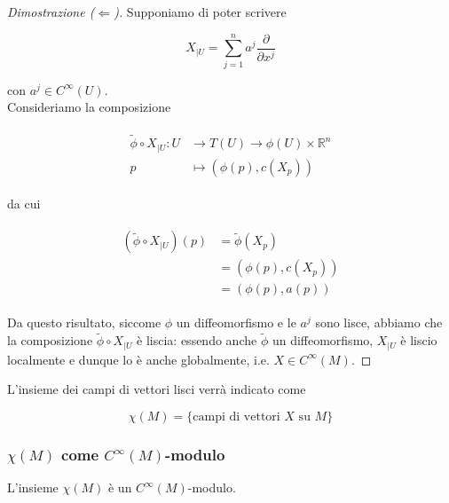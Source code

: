 \begin{proof}[Dimostrazione ($ \Longleftarrow $)]
	Supponiamo di poter scrivere
	
	\begin{equation}
		X_{|U} = \sum_{j=1}^{n} a^{j} \dfrac{\partial}{\partial x^{j}}
	\end{equation}
	
	con $ a^{j} \in C^{\infty}(U) $.\\
	Consideriamo la composizione
	
	\begin{align}
		\begin{split}
			\tilde{\phi} \circ X_{|U} : U &\to T(U) \to \phi(U) \times \mathbb{R}^{n}\\
			p &\mapsto (\phi(p),c(X_{p}))
		\end{split}
	\end{align}

	da cui
	
	\begin{align}
		\begin{split}
			(\tilde{\phi} \circ X_{|U})(p) &= \tilde{\phi}(X_{p})\\
			&= (\phi(p),c(X_{p}))\\
			&= (\phi(p),a(p))
		\end{split}
	\end{align}

	Da questo risultato, siccome $ \phi $  un diffeomorfismo e le $ a^{j} $ sono lisce, abbiamo che la composizione $ \tilde{\phi} \circ X_{|U} $ è liscia: essendo anche $ \tilde{\phi} $ un diffeomorfismo, $ X_{|U} $ è liscio localmente e dunque lo è anche globalmente, i.e. $ X \in C^{\infty}(M) $.
\end{proof}

L'insieme dei campi di vettori lisci verrà indicato come

\begin{equation}
	\chi(M) = \{ \text{campi di vettori } X \text{ su } M \}
\end{equation}

\subsubsection{$ \chi(M) $ come $ C^{\infty}(M) $-modulo}

\begin{definition}
	L'insieme $ \chi(M) $ è un $ C^{\infty}(M) $-modulo.
\end{definition}

